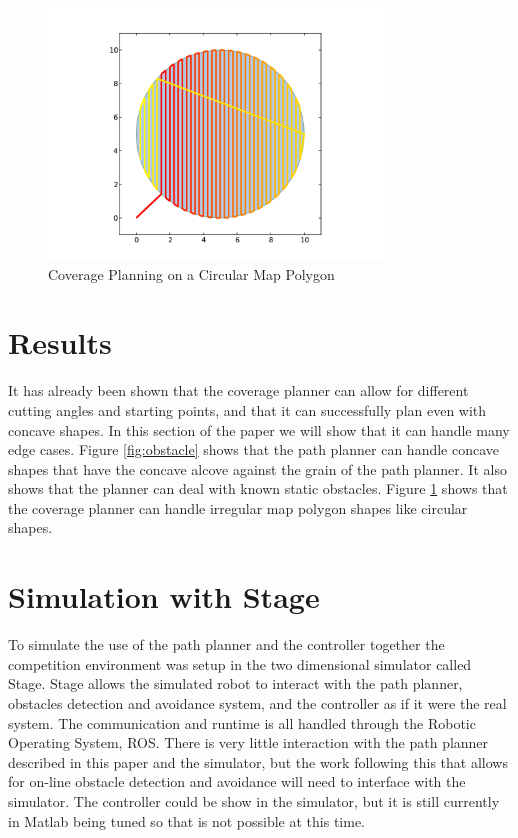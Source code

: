 \documentclass[journal]{IEEEtran}
\begin{document}
  \begin{figure}[here]
    \centering
    \includegraphics[width=3.5in,keepaspectratio]{circle.pdf}
    \caption{Coverage Planning on a Circular Map Polygon}
    \label{fig:circle}
  \end{figure}
  
  \section{Results}
  It has already been shown that the coverage planner can allow for different cutting angles and starting points, and that it can successfully plan even with concave shapes.  In this section of the paper we will show that it can handle many edge cases.  Figure \ref{fig:obstacle} shows that the path planner can handle concave shapes that have the concave alcove against the grain of the path planner.  It also shows that the planner can deal with known static obstacles.  Figure \ref{fig:circle} shows that the coverage planner can handle irregular map polygon shapes like circular shapes.
  
  \section{Simulation with Stage}
  To simulate the use of the path planner and the controller together the competition environment was setup in the two dimensional simulator called Stage\cite{vaughan2000stage}.  Stage allows the simulated robot to interact with the path planner, obstacles detection and avoidance system, and the controller as if it were the real system.  The communication and runtime is all handled through the Robotic Operating System, ROS\cite{quigley2009ros}.  There is very little interaction with the path planner described in this paper and the simulator, but the work following this that allows for on-line obstacle detection and avoidance will need to interface with the simulator.  The controller could be show in the simulator, but it is still currently in Matlab being tuned so that is not possible at this time.
  
\end{document}
